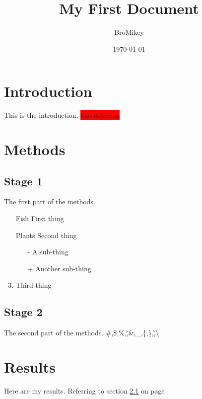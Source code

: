 \documentclass[a4paper, 12pt]{article}
\begin{document}
	\title{My First Document}
	\author{BroMikey}
	\date{\today}
	\maketitle
	\tableofcontents
	\newpage
	
	\section{Introduction}
	{\color{blue}This is the introduction.}
	\colorbox{red}{test colorbox}
	
	\section{Methods}
	
	\subsection{Stage 1}
	\label{sec1}The first part of the methods.
	\begin{enumerate}
		\item[Fish] First thing
		
		\item[Plants] Second thing
			\begin{itemize}
				\item[-] A sub-thing
				
				\item[+] Another sub-thing
			\end{itemize}
		\item Third thing
	\end{enumerate}
	
	\subsection{Stage 2}
	The second part of the methods.%
	\#,\$,\%,\^,\&,\_,\{,\},\~,\textbackslash\\%
	
	\section{Results}
	Here are my results. Referring to section \ref{sec1} on page \pageref{sec1}
\end{document}

